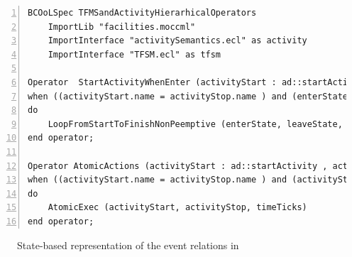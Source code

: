 \begin{lstlisting}[language=bcool,
caption={Timing and Hierarchical operator between TFSM and fUML languages},
label={lst:bcoolStartActivityWhenEnter}, 
basicstyle=\scriptsize\ttfamily, backgroundcolor=\color{LGrey}, numbers=left, xleftmargin=2pt]
BCOoLSpec TFMSandActivityHierarhicalOperators
	ImportLib "facilities.moccml"
	ImportInterface "activitySemantics.ecl" as activity
	ImportInterface "TFSM.ecl" as tfsm

Operator  StartActivityWhenEnter (activityStart : ad::startActivity , activityStop : ad::finishActivity, enterState : tfsm::entering, leaveState : tfsm::leaving)
when ((activityStart.name = activityStop.name ) and (enterState.name = leaveState.name) and (activityStart.name = enterState.onEnterAction.name));
do 
	LoopFromStartToFinishNonPeemptive (enterState, leaveState, activityStart, activityStop)
end operator;

Operator AtomicActions (activityStart : ad::startActivity , activityStop : ad::finishActivity, enterState : tfsm::entering, leaveState : tfsm::leaving, timeTicks : tfsm::ticks)
when ((activityStart.name = activityStop.name ) and (activityStart.name=enterState.OnEnterAction.name ) and (enterState.owningFSM.localClock = timeTicks));
do 
	AtomicExec (activityStart, activityStop, timeTicks)
end operator;
\end{lstlisting}


\begin{figure}[h]
	\centering
	\caption[]{State-based representation of the event relations in \moccml}
	\label{fig:subfigurestatebased}
\end{figure}



